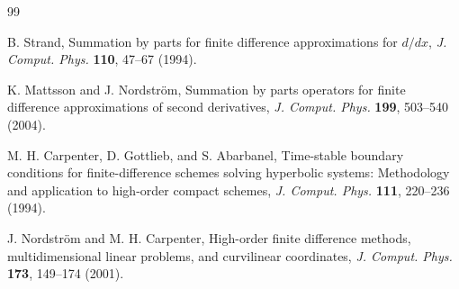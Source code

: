 \documentclass[
  aps,
  pre,
  reprint,
  superscriptaddress,
  nofootinbib
]{revtex4-2}
\begin{document}
\begin{thebibliography}{99}

B. Strand,
Summation by parts for finite difference approximations for $d/dx$,
\textit{J. Comput. Phys.} \textbf{110}, 47--67 (1994).

K. Mattsson and J. Nordstr\"om,
Summation by parts operators for finite difference approximations of second derivatives,
\textit{J. Comput. Phys.} \textbf{199}, 503--540 (2004).

M. H. Carpenter, D. Gottlieb, and S. Abarbanel,
Time-stable boundary conditions for finite-difference schemes solving
hyperbolic systems: Methodology and application to high-order compact schemes,
\textit{J. Comput. Phys.} \textbf{111}, 220--236 (1994).

J. Nordstr\"om and M. H. Carpenter,
High-order finite difference methods, multidimensional linear problems, and
curvilinear coordinates,
\textit{J. Comput. Phys.} \textbf{173}, 149--174 (2001).

\end{thebibliography}
\end{document}
